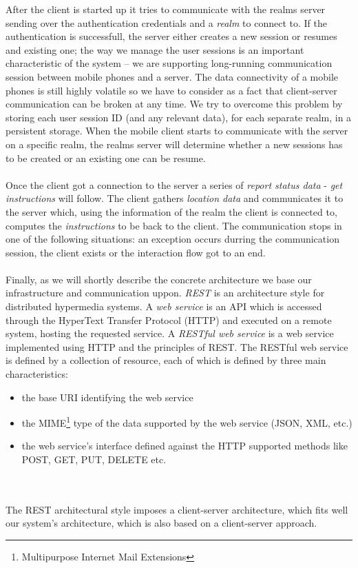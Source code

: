 After the client is started up it tries to communicate with the realms server sending over the authentication credentials and a \emph{realm} to connect to. If the authentication is successfull, the server either creates a new session or resumes and existing one; the way we manage the user sessions is an important characteristic of the system -- we are supporting long-running communication session between mobile phones and a server. The data connectivity of a mobile phones is still highly volatile so we have to consider as a fact that client-server communication can be broken at any time. We try to overcome this problem by storing each user session ID (and any relevant data), for each separate realm, in a persistent storage. When the mobile client starts to communicate with the server on a specific realm, the realms server will determine whether a new sessions has to be created or an existing one can be resume.
\\\\
Once the client got a connection to the server a series of \emph{report status data} - \emph{get instructions} will follow. The client gathers \emph{location data} and communicates it to the server which, using the information of the realm the client is connected to, computes the \emph{instructions} to be back to the client. The communication stops in one of the following situations: an exception occurs durring the communication session, the client exists or the interaction flow got to an end.
\\\\
Finally, as we will shortly describe the concrete architecture we base our infrastructure and communication uppon. \emph{REST} is an architecture style for distributed hypermedia systems. A \emph{web service} is an API which is accessed through the HyperText Transfer Protocol (HTTP) and executed on a remote system, hosting the requested service. A \emph{RESTful web service} is a web service implemented using HTTP and the principles of REST. The RESTful web service is defined by a collection of resource, each of which is defined by three main characteristics:
\begin{itemize}
  \item the base URI identifying the web service
  \item the MIME\footnote{Multipurpose Internet Mail Extensions} type of the
  data supported by the web service (JSON, XML, etc.)
  \item the web service's interface defined against the HTTP supported methods
  like POST, GET, PUT, DELETE etc.
\end{itemize}
\\\\
The REST architectural style imposes a client-server architecture, which fits well our system's architecture, which is also based on a client-server approach.

